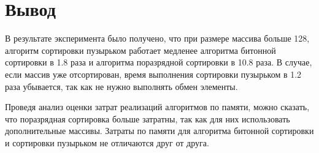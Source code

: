 \section{Вывод}
В результате эксперимента было получено, что при размере массива больше 128, алгоритм сортировки пузырьком работает медленее алгоритма битонной сортировки в 1.8 раза и алгоритма поразрядной сортировки в 10.8 раза.
В случае, если массив уже отсортирован, время выполнения сортировки пузырьком в 1.2 раза убывается, так как не нужно выполнять обмен элементы.

Проведя анализ оценки затрат реализаций алгоритмов по памяти, можно сказать, что поразрядная сортировка больше затратны, так как для них использовать дополнительные массивы.
Затраты по памяти для алгоритма битонной сортировки и сортировки пузырьком не отличаются друг от друга.